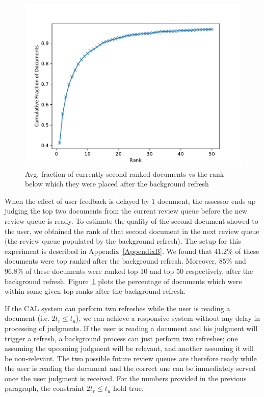 \begin{figure}[h]
\includegraphics[width=\textwidth]{plots/top_doc_avg_rank.pdf}
\caption{Avg. fraction of currently second-ranked documents vs the rank below
which they were placed after the background refresh}
\label{plot:async}
\end{figure}

When the effect of user feedback is delayed by 1 document, the assessor ends up
judging the top two documents from the current review queue before the new
review queue is ready. To estimate the quality of the second
document showed to the user, we obtained the rank of that second document
in the next review queue (the review queue populated by the background refresh).
The setup for this experiment is described in Appendix~\ref{AppendixB}. We found that
$41.2\%$ of these documents were top ranked after the background refresh.
Moreover, $85\%$ and $96.8\%$ of these documents were ranked top 10 and top 50
respectively, after the background refresh. Figure~\ref{plot:async} plots the
percentage of documents which were within some given top ranks after the
background refresh.



If the CAL system can perform two refreshes while the user is reading a
document (i.e. $2t_r \le t_u$), we can achieve a responsive system without any
delay in processing of judgments. If the user is reading a document and his
judgment will trigger a refresh, a background process can just perform two refreshes;
one assuming the upcoming judgment will be relevant, and another assuming it
will be non-relevant.  The two possible future review queues are therefore ready
while the user is reading the document and the correct one can be immediately
served once the user judgment is received. For the numbers provided in the
previous paragraph, the constraint $2t_r \le t_u$ hold true.

